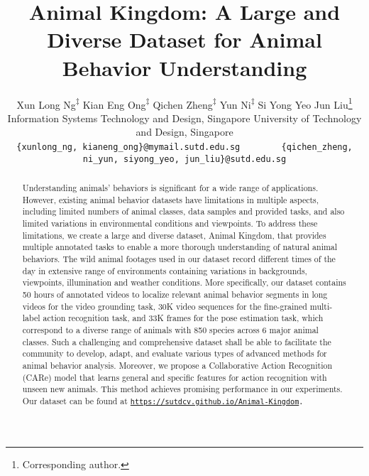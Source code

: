 \documentclass[10pt,twocolumn,letterpaper]{article}
\begin{document}
\title{Animal Kingdom: A Large and Diverse Dataset for Animal Behavior Understanding}

\author{
Xun Long Ng{\textsuperscript{‡}}\quad 
Kian Eng Ong{\textsuperscript{‡}}\quad
Qichen Zheng{\textsuperscript{‡}}\quad
Yun Ni{\textsuperscript{‡}}\quad 
Si Yong Yeo \quad
Jun Liu\thanks{Corresponding author.} \\
\normalsize Information Systems Technology and Design, 
Singapore University of Technology and Design, Singapore
\\
{\tt\scriptsize \{xunlong\_ng, kianeng\_ong\}@mymail.sutd.edu.sg} ~~~~~~~
{\tt\scriptsize \{qichen\_zheng, ni\_yun, siyong\_yeo, jun\_liu\}@sutd.edu.sg}
}

\maketitle

\def\thefootnote{{\textsuperscript{‡}}}

\begin{abstract}
    \vspace{-0.3cm}
    
    Understanding animals' behaviors is significant for a wide range of applications. However, existing animal behavior datasets have limitations in multiple aspects, including limited numbers of animal classes, data samples and provided tasks, and also limited variations in environmental conditions and viewpoints. To address these limitations, we create a large and diverse dataset, Animal Kingdom, that provides multiple annotated tasks to enable a more thorough understanding of natural animal behaviors. The wild animal footages used in our dataset record different times of the day in extensive range of environments containing variations in backgrounds, viewpoints, illumination and weather conditions. More specifically, our dataset contains 50 hours of annotated videos to localize relevant animal behavior segments in long videos for the video grounding task, 30K video sequences for the fine-grained multi-label action recognition task, and 33K frames for the pose estimation task, which correspond to a diverse range of animals with 850 species across 6 major animal classes. Such a challenging and comprehensive dataset shall be able to facilitate the community to develop, adapt, and evaluate various types of advanced methods for animal behavior analysis. Moreover, we propose a Collaborative Action Recognition (CARe) model that learns general and specific features for action recognition with unseen new animals. This method achieves promising performance in our experiments.
    Our dataset can be found at \tt\footnotesize{\url{https://sutdcv.github.io/Animal-Kingdom}}.
    \end{abstract}
    
\end{document}
